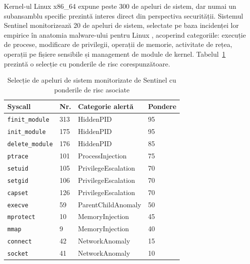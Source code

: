 \par Kernel-ul Linux x86\_64 expune peste 300 de apeluri de sistem, dar numai un subansamblu specific prezintă interes direct din perspectiva securității. Sistemul Sentinel monitorizează 20 de apeluri de sistem, selectate pe baza incidenței lor empirice în anatomia malware-ului pentru Linux \cite{Cozzi2018}, acoperind categoriile: execuție de procese, modificare de privilegii, operații de memorie, activitate de rețea, operații pe fișiere sensibile și management de module de kernel. Tabelul~\ref{tab:syscalls_risk} prezintă o selecție cu ponderile de risc corespunzătoare.

\begin{table}[htbp]
\begin{center}
\begin{tabular}{|p{80pt}|p{40pt}|p{90pt}|p{60pt}|}
\hline
\textbf{Syscall} & \textbf{Nr.} & \textbf{Categorie alertă} & \textbf{Pondere} \\
\hline\hline
\texttt{finit\_module} & 313 & HiddenPID           & 95 \\
\hline
\texttt{init\_module}  & 175 & HiddenPID           & 95 \\
\hline
\texttt{delete\_module}& 176 & HiddenPID           & 85 \\
\hline
\texttt{ptrace}        & 101 & ProcessInjection    & 75 \\
\hline
\texttt{setuid}        & 105 & PrivilegeEscalation & 70 \\
\hline
\texttt{setgid}        & 106 & PrivilegeEscalation & 70 \\
\hline
\texttt{capset}        & 126 & PrivilegeEscalation & 70 \\
\hline
\texttt{execve}        & 59  & ParentChildAnomaly  & 50 \\
\hline
\texttt{mprotect}      & 10  & MemoryInjection     & 45 \\
\hline
\texttt{mmap}          & 9   & MemoryInjection     & 40 \\
\hline
\texttt{connect}       & 42  & NetworkAnomaly      & 15 \\
\hline
\texttt{socket}        & 41  & NetworkAnomaly      & 10 \\
\hline
\end{tabular}
\end{center}
\caption{Selecție de apeluri de sistem monitorizate de Sentinel cu ponderile de risc asociate}
\label{tab:syscalls_risk}
\end{table}


